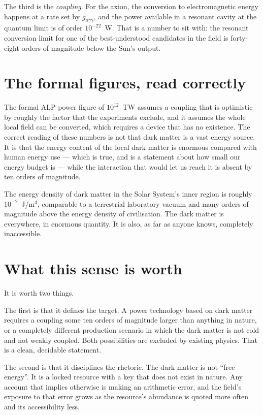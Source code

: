 The third is the \emph{coupling}. For the axion, the conversion to
electromagnetic energy happens at a rate set by $g_{a\gamma\gamma}$, and the
power available in a resonant cavity at the quantum limit is of order
$10^{-22}$~W. That is a number to sit with: the resonant conversion limit
for one of the best-understood candidates in the field is forty-eight orders
of magnitude below the Sun's output.

\section{The formal figures, read correctly}The formal ALP power figure of
$10^{12}$~TW assumes a coupling that is optimistic by roughly the factor
that the experiments exclude, and it assumes the whole local field can be
converted, which requires a device that has no existence. The correct
reading of these numbers is not that dark matter is a vast energy source.
It is that the energy content of the local dark matter is enormous compared
with human energy use --- which is true, and is a statement about how small
our energy budget is --- while the interaction that would let us reach it is
absent by ten orders of magnitude.

The energy density of dark matter in the Solar System's inner region is
roughly $10^{-2}$~J/m\(^{3}\), comparable to a terrestrial laboratory
vacuum and many orders of magnitude above the energy density of
civilisation. The dark matter is everywhere, in enormous quantity. It is
also, as far as anyone knows, completely inaccessible.

\section{What this sense is worth}It is worth two things.

The first is that it defines the target. A power technology based on dark
matter requires a coupling some ten orders of magnitude larger than anything
in nature, or a completely different production scenario in which the dark
matter is not cold and not weakly coupled. Both possibilities are excluded by
existing physics. That is a clean, decidable statement.

The second is that it disciplines the rhetoric. The dark matter is not
``free energy''. It is a locked resource with a key that does not exist in
nature. Any account that implies otherwise is making an arithmetic error,
and the field's exposure to that error grows as the resource's abundance is
quoted more often and its accessibility less.

